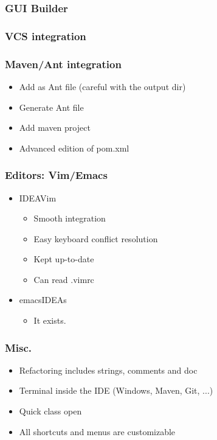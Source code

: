 \begin{frame}
  \frametitle{GUI Builder}
\end{frame}


\begin{frame}
  \frametitle{VCS integration}
\end{frame}

\begin{frame}
  \frametitle{Maven/Ant integration}
      \begin{itemize}
        \item Add as Ant file (careful with the output dir)
        \item Generate Ant file
        \item Add maven project
        \item Advanced edition of pom.xml
      \end{itemize}
\end{frame}

\begin{frame}
  \frametitle{Editors: Vim/Emacs}
  \begin{itemize}
    \item IDEAVim
      \begin{itemize}
        \item Smooth integration
        \item Easy keyboard conflict resolution
        \item Kept up-to-date
        \item Can read .vimrc
      \end{itemize}
    \item emacsIDEAs
      \begin{itemize}
        \item It exists.
      \end{itemize}
  \end{itemize}
\end{frame}

\begin{frame}
  \frametitle{Misc.}
  \begin{itemize}
    \item Refactoring includes strings, comments and doc
    \item Terminal inside the IDE (Windows, Maven, Git, ...)
    \item Quick class open
    \item All shortcuts and menus are customizable
  \end{itemize}
\end{frame}

